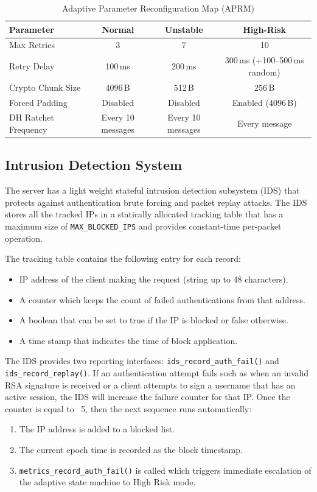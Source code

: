 \documentclass[conference]{IEEEtran}
\begin{document}
\begin{table}[t]
\caption{Adaptive Parameter Reconfiguration Map (APRM)}
\label{tab:aprm}
\begin{center}
\begin{tabular}{|l|c|c|c|}
\hline
\textbf{Parameter} & \textbf{Normal} & \textbf{Unstable} & \textbf{High-Risk} \\
\hline
Max Retries & 3 & 7 & 10 \\
\hline
Retry Delay & 100\,ms & 200\,ms & 300\,ms (+100--500\,ms random) \\
\hline
Crypto Chunk Size & 4096\,B & 512\,B & 256\,B \\
\hline
Forced Padding & Disabled & Disabled & Enabled (4096\,B) \\
\hline
DH Ratchet Frequency & Every 10 messages & Every 10 messages & Every message \\
\hline
\end{tabular}
\end{center}
\end{table}

\subsection{Intrusion Detection System}

The server has a light weight stateful intrusion detection subsystem (IDS) that protects against authentication brute forcing and packet replay attacks. The IDS stores all the tracked IPs in a statically allocated tracking table that has a maximum size of \texttt{MAX\_BLOCKED\_IPS} and provides constant-time per-packet operation.

The tracking table contains the following entry for each record:
\begin{itemize}
    \item IP address of the client making the request (string up to 48 characters).
    \item A counter which keeps the count of failed authentications from that address.
    \item A boolean that can be set to true if the IP is blocked or false otherwise.
    \item A time stamp that indicates the time of block application.
\end{itemize}

The IDS provides two reporting interfaces: \texttt{ids\_record\_auth\_fail()} and \texttt{ids\_record\_replay()}. If an authentication attempt fails such as when an invalid RSA signature is received or a client attempts to sign a username that has an active session, the IDS will increase the failure counter for that IP. Once the counter is equal to ~5, then the next sequence runs automatically:
\begin{enumerate}
    \item The IP address is added to a blocked list.
    \item The current epoch time is recorded as the block timestamp.
    \item \texttt{metrics\_record\_auth\_fail()} is called which triggers immediate escalation of the adaptive state machine to High Risk mode.
\end{enumerate}
\end{document}

